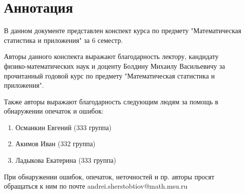 \section*{Аннотация}

В данном документе представлен конспект курса по
предмету "Математическая статистика и приложения"
за 6 семестр.

Авторы данного конспекта выражают благодарность лектору, кандидату \\ физико-математических наук и доценту
Болдину Михаилу Васильевичу за прочитанный годовой курс по предмету
"Математическая статистика и приложения".

Также авторы выражают благодарность следующим людям за помощь
в обнаружении опечаток и ошибок:
\begin{enumerate}
    \item Османкин Евгений (333 группа)
    \item Акимов Иван (332 группа)
    \item Ладыкова Екатерина (333 группа)
\end{enumerate}

При обнаружении ошибок, опечаток, неточностей и пр. авторы просят
обращаться к ним по почте andrei.sherstobtiov@math.msu.ru